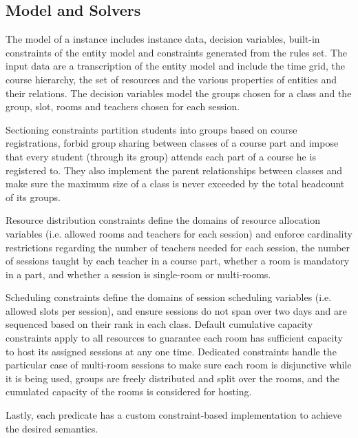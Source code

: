\subsection{\CP{} Model and Solvers}

The \CP{} model of a \UTP{} instance includes instance data, decision variables, built-in constraints of the entity model and constraints generated from the rules set. %
The input data are a transcription of the entity model and include the time grid, the course hierarchy, the set of resources and the various properties of entities and their relations.
The decision variables model the groups chosen for a class and the group, slot, rooms and teachers chosen for each session.

Sectioning constraints partition students into groups based on course registrations, %
forbid group sharing between classes of a course part and impose that every student (through its group) attends each part of a course he is registered to.
They also implement the parent relationships between classes and make sure the maximum size of a class is never exceeded by the total headcount of its groups. 

Resource distribution constraints define the domains of resource allocation variables (i.e. allowed rooms and teachers for each session)
and enforce cardinality restrictions regarding the number of teachers needed for each session, the number of sessions taught by each teacher in a course part, whether a room is mandatory in a part, and whether a session is single-room or multi-rooms.

Scheduling constraints define the domains of session scheduling variables (i.e. allowed slots per session),
and ensure sessions do not span over two days and are sequenced based on their rank in each class.
Default cumulative capacity constraints apply to all resources to guarantee each room has sufficient capacity to host its assigned sessions at any one time.
Dedicated constraints handle the particular case of multi-room sessions to make sure 
each room is disjunctive while it is being used,
groups are freely distributed and split over the rooms,
and the cumulated capacity of the rooms is considered for hosting.

Lastly, each {\UTP} predicate has a custom constraint-based implementation to achieve the desired semantics.



